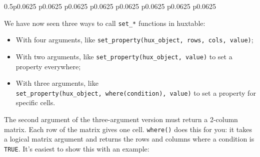 \documentclass[]{article}
\providecommand{\tightlist}{%
  \setlength{\itemsep}{0pt}\setlength{\parskip}{0pt}}
\begin{document}
\begin{table}[h]
\begin{raggedright}
\begin{tabularx}{0.5\textwidth}{p{} p{} p{} p{} p{} p{} p{} p{}}
\tabularnewline[-0.5pt]


\end{tabularx}
\par\end{raggedright}
\end{table}

\FloatBarrier

We have now seen three ways to call \texttt{set\_*} functions in
huxtable:

\begin{itemize}
\tightlist
\item
  With four arguments, like
  \texttt{set\_property(hux\_object,\ rows,\ cols,\ value)};
\item
  With two arguments, like \texttt{set\_property(hux\_object,\ value)}
  to set a property everywhere;
\item
  With three arguments, like
  \texttt{set\_property(hux\_object,\ where(condition),\ value)} to set
  a property for specific cells.
\end{itemize}

The second argument of the three-argument version must return a 2-column
matrix. Each row of the matrix gives one cell. \texttt{where()} does
this for you: it takes a logical matrix argument and returns the rows
and columns where a condition is \texttt{TRUE}. It's easiest to show
this with an example:
\end{document}
